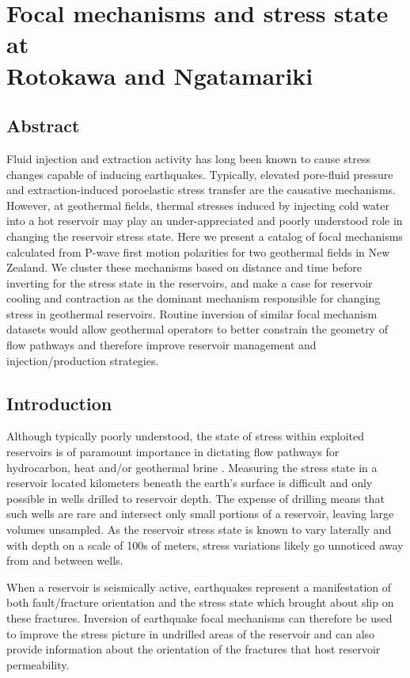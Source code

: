 \chapter[Focal mechanisms and stress state at Rotokawa and Ngatamariki]{Focal mechanisms and stress state at \\Rotokawa and Ngatamariki}

\section*{Abstract}
Fluid injection and extraction activity has long been known to cause stress changes capable of inducing earthquakes. Typically, elevated pore-fluid pressure and extraction-induced poroelastic stress transfer are the causative mechanisms. However, at geothermal fields, thermal stresses induced by injecting cold water into a hot reservoir may play an under-appreciated and poorly understood role in changing the reservoir stress state. Here we present a catalog of focal mechanisms calculated from P-wave first motion polarities for two geothermal fields in New Zealand. We cluster these mechanisms based on distance and time before inverting for the stress state in the reservoirs, and make a case for reservoir cooling and contraction as the dominant mechanism responsible for changing stress in geothermal reservoirs. Routine inversion of similar focal mechanism datasets would allow geothermal operators to better constrain the geometry of flow pathways and therefore improve reservoir management and injection\slash{production} strategies.

\section{Introduction}
Although typically poorly understood, the state of stress within exploited reservoirs is of paramount importance in dictating flow pathways for hydrocarbon, heat and\slash{or} geothermal brine \citep{zoback2010}. Measuring the stress state in a reservoir located kilometers beneath the earth's surface is difficult and only possible in wells drilled to reservoir depth. The expense of drilling means that such wells are rare and intersect only small portions of a reservoir, leaving large volumes unsampled. As the reservoir stress state is known to vary laterally and with depth \citep{blake2011crustal,davidson_2012,McNamara_2015} on a scale of 100s of meters, stress variations likely go unnoticed away from and between wells.

When a reservoir is seismically active, earthquakes represent a manifestation of both fault\slash{fracture} orientation and the stress state which brought about slip on these fractures. Inversion of earthquake focal mechanisms can therefore be used to improve the stress picture in undrilled areas of the reservoir and can also provide information about the orientation of the fractures that host reservoir \gls{permeability}.


